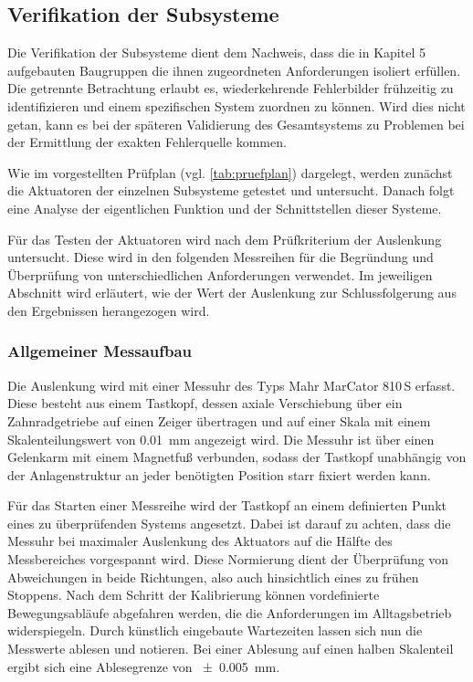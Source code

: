 \subsection{Verifikation der Subsysteme}\label{sec:VerifikationSubsysteme}
Die Verifikation der Subsysteme dient dem Nachweis, dass die in Kapitel 5 aufgebauten Baugruppen die ihnen zugeordneten
Anforderungen isoliert erfüllen. Die getrennte Betrachtung erlaubt es, wiederkehrende Fehlerbilder frühzeitig zu identifizieren
und einem spezifischen System zuordnen zu können. Wird dies nicht getan, kann es bei der späteren Validierung des Gesamtsystems zu Problemen
bei der Ermittlung der exakten Fehlerquelle kommen.

Wie im vorgestellten Prüfplan (vgl. \cref{tab:pruefplan}) dargelegt, werden zunächst die Aktuatoren der einzelnen Subsysteme
getestet und untersucht. Danach folgt eine Analyse der eigentlichen Funktion und der Schnittstellen dieser Systeme.

Für das Testen der Aktuatoren wird nach dem Prüfkriterium der Auslenkung untersucht. Diese wird in den folgenden Messreihen
für die Begründung und Überprüfung von unterschiedlichen Anforderungen verwendet. Im jeweiligen Abschnitt wird erläutert,
wie der Wert der Auslenkung zur Schlussfolgerung aus den Ergebnissen herangezogen wird.
%
\subsubsection{Allgemeiner Messaufbau}
Die Auslenkung wird mit einer Messuhr des Typs Mahr MarCator 810\,S erfasst.
Diese besteht aus einem Tastkopf, dessen axiale Verschiebung über ein
Zahnradgetriebe auf einen Zeiger übertragen und auf einer Skala mit einem
Skalenteilungswert von \qty{0.01}{\milli\meter} angezeigt wird. Die Messuhr ist
über einen Gelenkarm mit einem Magnetfuß verbunden, sodass der Tastkopf
unabhängig von der Anlagenstruktur an jeder benötigten Position starr fixiert
werden kann.

Für das Starten einer Messreihe wird der Tastkopf an einem definierten Punkt eines zu überprüfenden Systems angesetzt. Dabei ist
darauf zu achten, dass die Messuhr bei maximaler Auslenkung des Aktuators auf die Hälfte des Messbereiches vorgespannt wird.
Diese Normierung dient der Überprüfung von Abweichungen in beide Richtungen, also auch hinsichtlich eines zu frühen Stoppens.
Nach dem Schritt der Kalibrierung können vordefinierte Bewegungsabläufe abgefahren werden, die die Anforderungen im Alltagsbetrieb
widerspiegeln. Durch künstlich eingebaute Wartezeiten lassen sich nun die Messwerte ablesen und notieren. Bei einer Ablesung auf
einen halben Skalenteil ergibt sich eine Ablesegrenze von \qty{\pm0.005}{\milli\meter}.

